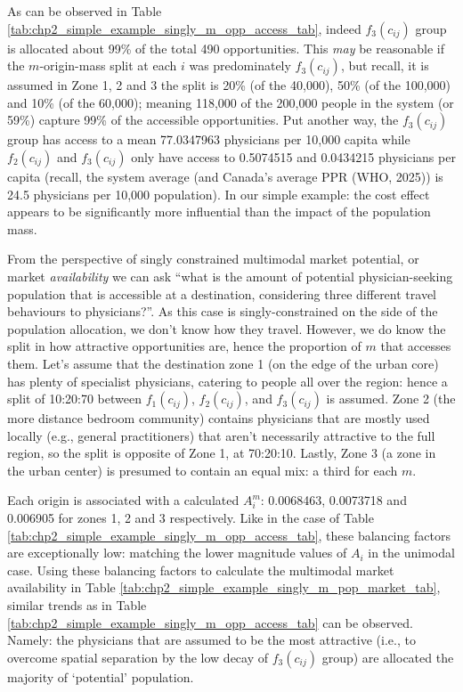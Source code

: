 \documentclass[
11pt, %
oneside, %
english, %
singlespacing, %
]{macthesis} %
\begin{document}


As can be observed in Table \ref{tab:chp2_simple_example_singly_m_opp_access_tab}, indeed \(f_3(c_{ij})\) group is allocated about 99\% of the total 490 opportunities. This \emph{may} be reasonable if the \(m\)-origin-mass split at each \(i\) was predominately \(f_3(c_{ij})\), but recall, it is assumed in Zone 1, 2 and 3 the split is 20\% (of the 40,000), 50\% (of the 100,000) and 10\% (of the 60,000); meaning 118,000 of the 200,000 people in the system (or 59\%) capture 99\% of the accessible opportunities. Put another way, the \(f_3(c_{ij})\) group has access to a mean 77.0347963 physicians per 10,000 capita while \(f_2(c_{ij})\) and \(f_3(c_{ij})\) only have access to 0.5074515 and 0.0434215 physicians per capita (recall, the system average (and Canada's average PPR (WHO, 2025)) is 24.5 physicians per 10,000 population). In our simple example: the cost effect appears to be significantly more influential than the impact of the population mass.

From the perspective of singly constrained multimodal market potential, or market \emph{availability} we can ask ``what is the amount of potential physician-seeking population that is accessible at a destination, considering three different travel behaviours to physicians?''. As this case is singly-constrained on the side of the population allocation, we don't know how they travel. However, we do know the split in how attractive opportunities are, hence the proportion of \(m\) that accesses them. Let's assume that the destination zone 1 (on the edge of the urban core) has plenty of specialist physicians, catering to people all over the region: hence a split of 10:20:70 between \(f_1(c_{ij})\), \(f_2(c_{ij})\), and \(f_3(c_{ij})\) is assumed. Zone 2 (the more distance bedroom community) contains physicians that are mostly used locally (e.g., general practitioners) that aren't necessarily attractive to the full region, so the split is opposite of Zone 1, at 70:20:10. Lastly, Zone 3 (a zone in the urban center) is presumed to contain an equal mix: a third for each \(m\).

Each origin is associated with a calculated \(A_i^m\): 0.0068463, 0.0073718 and 0.006905 for zones 1, 2 and 3 respectively. Like in the case of Table \ref{tab:chp2_simple_example_singly_m_opp_access_tab}, these balancing factors are exceptionally low: matching the lower magnitude values of \(A_i\) in the unimodal case. Using these balancing factors to calculate the multimodal market availability in Table \ref{tab:chp2_simple_example_singly_m_pop_market_tab}, similar trends as in Table \ref{tab:chp2_simple_example_singly_m_opp_access_tab} can be observed. Namely: the physicians that are assumed to be the most attractive (i.e., to overcome spatial separation by the low decay of \(f_3(c_{ij})\) group) are allocated the majority of `potential' population.
\end{document}
